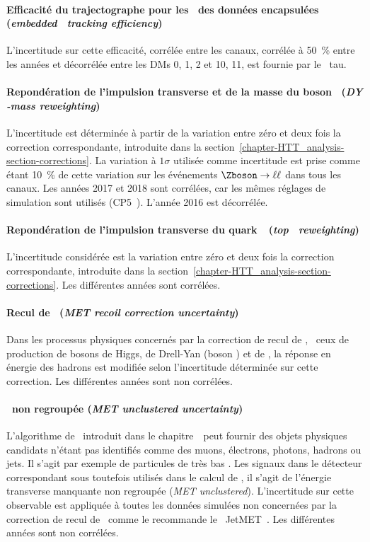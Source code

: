 \paragraph{Efficacité du trajectographe pour les \tauh\ des données encapsulées (\emph{embedded \tauh\ tracking efficiency})}
L'incertitude sur cette efficacité,
corrélée entre les canaux,
corrélée à \SI{50}{\%} entre les années et
décorrélée entre les DMs 0, 1, 2 et 10, 11, 
est fournie par le \POG\ tau.
\paragraph{Repondération de l'impulsion transverse et de la masse du boson \Zboson\ (\emph{DY \pT-mass reweighting})}
L'incertitude est déterminée à partir de la variation entre zéro et deux fois la correction correspondante, introduite dans la section~\ref{chapter-HTT_analysis-section-corrections}.
La variation à $1\sigma$ utilisée comme incertitude est prise comme étant \SI{10}{\%} de cette variation sur les événements $\Zboson\to\ell\ell$ dans tous les canaux.
Les années 2017 et 2018 sont corrélées, car les mêmes réglages de simulation sont utilisés (CP5~\cite{tunes_2019}).
L'année 2016 est décorrélée.
\paragraph{Repondération de l'impulsion transverse du quark~\quarkt\ (\emph{top \pT\ reweighting})}
L'incertitude considérée est la variation entre zéro et deux fois la correction correspondante, introduite dans la section~\ref{chapter-HTT_analysis-section-corrections}.
Les différentes années sont corrélées.
\paragraph{Recul de \MET\ (\emph{MET recoil correction uncertainty})}
Dans les processus physiques concernés par la correction de recul de \MET,
\ie\ ceux de production de bosons de Higgs, de Drell-Yan (boson \Zboson) et de \Wjets,
la réponse en énergie des hadrons est modifiée selon l'incertitude déterminée sur cette correction.
Les différentes années sont non corrélées.
\paragraph{\MET\ non regroupée (\emph{MET unclustered uncertainty})}
L'algorithme de \PF\ introduit dans le chapitre~\ peut fournir des objets physiques candidats n'étant pas identifiés comme des muons, électrons, photons, hadrons ou jets.
Il s'agit par exemple de particules de très bas \pT.
Les signaux dans le détecteur correspondant sous toutefois utilisés dans le calcul de \MET, il s'agit de l'énergie transverse manquante non regroupée (\emph{MET unclustered}).
L'incertitude sur cette observable est appliquée à toutes les données simulées non concernées par la correction de recul de \MET\ comme le recommande le \POG\ JetMET~\cite{MET_corrections}.
Les différentes années sont non corrélées.
